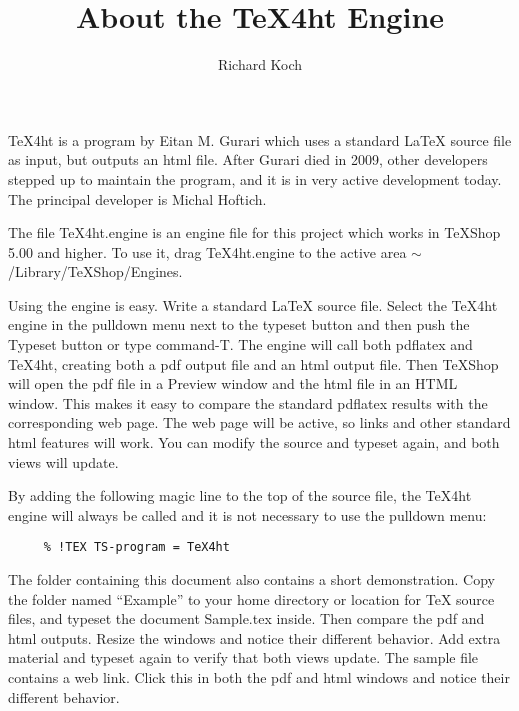\documentclass[11pt, oneside]{article}   	%
\title{About the TeX4ht Engine}
\author{Richard Koch}
\begin{document}
\maketitle
TeX4ht is a program by Eitan M. Gurari which uses a standard LaTeX source file as input, but outputs an html file. After Gurari died in 2009, other developers stepped up to maintain the program, and it is in very active development today. The principal developer is Michal Hoftich.

The file TeX4ht.engine is an engine file for this project which works in TeXShop 5.00 and higher. To use it, drag TeX4ht.engine to the active  area $\sim$/Library/TeXShop/Engines. 

Using the engine is easy. Write a standard LaTeX source file. Select the TeX4ht engine in the pulldown menu next to the typeset button and then push the Typeset button or type command-T. The engine will call both pdflatex and TeX4ht, creating both a pdf output file and an html output file. Then TeXShop will open the pdf file in a Preview window and the html file in an HTML window. This makes it easy to compare the standard pdflatex results with the corresponding web page. The web page will be active, so links and other standard html features will work. You can modify the source and typeset again, and both views will update.

By adding the following magic line to the top of the source file, the TeX4ht engine will always be called and it is not necessary to use the pulldown menu:
\begin{verbatim}
     % !TEX TS-program = TeX4ht
\end{verbatim}

The folder containing this document also contains a short demonstration. Copy the folder named ``Example'' to your home directory or location for TeX source files, and typeset the document Sample.tex inside. Then compare the pdf and html outputs. Resize the windows and notice their different behavior. Add extra material and typeset again to verify that both views update. The sample file contains a web link. Click this in both the pdf and html windows and notice their different behavior.
\end{document}
